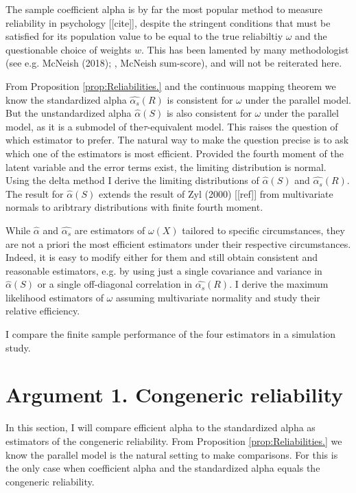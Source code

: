 \documentclass{article}
\theoremstyle{plain}
\theoremstyle{plain}
\theoremstyle{definition}
\theoremstyle{remark}
\theoremstyle{definition}
\theoremstyle{plain}
\theoremstyle{plain}
\theoremstyle{definition}
\begin{document}
The sample coefficient alpha is by far the most popular method to
measure reliability in psychology [[cite]], despite the stringent conditions
that must be satisfied for its population value to be equal to the
true reliabiltiy $\omega$ and the questionable choice of weights $w$. This has been lamented by
many methodologist (see e.g. McNeish (2018); \citet{hancock2001rethinking}, McNeish sum-score), and will not be reiterated
here.

From Proposition \ref{prop:Reliabilities.} and the continuous mapping
theorem we know the standardized alpha $\widehat{\alpha_s}(R)$
is consistent for $\omega$ under the parallel model.
But the unstandardized alpha $\widehat{\alpha}\left(S\right)$
is also consistent for $\omega$ under the parallel
model, as it is a submodel of the$\tau$-equivalent model. This raises
the question of which estimator to prefer. The natural way to make
the question precise is to ask which one of the estimators is most
efficient. Provided the fourth moment of the latent variable and the
error terms exist, the limiting distribution is normal. Using the
delta method I derive the limiting distributions of $\widehat{\alpha}\left(S\right)$
and $\widehat{\alpha_s}(R)$. The result for $\widehat{\alpha}\left(S\right)$
extends the result of Zyl (2000) {[}{[}ref{]}{]} from multivariate
normals to aribtrary distributions with finite fourth moment.

While $\widehat{\alpha}$ and $\widehat{\alpha_s}$
are estimators of $\omega(X)$ tailored to specific circumstances,
they are not a priori the most efficient estimators under their
respective circumstances. Indeed, it is easy to modify either for
them and still obtain consistent and reasonable estimators, e.g. by
using just a single covariance and variance in $\widehat{\alpha}\left(S\right)$
or a single off-diagonal correlation in $\widehat{\alpha_s}(R)$.
I derive the maximum likelihood estimators of $\omega$
assuming multivariate normality and study their relative efficiency.

I compare the finite sample performance of the four estimators in
a simulation study.

\section{Argument 1. Congeneric reliability}

In this section, I will compare efficient alpha to the standardized alpha as estimators of the congeneric reliability. From Proposition \ref{prop:Reliabilities.} we know the parallel model is the natural setting to make comparisons. For this is the only case when coefficient alpha and the standardized alpha equals the congeneric reliability.
\end{document}

